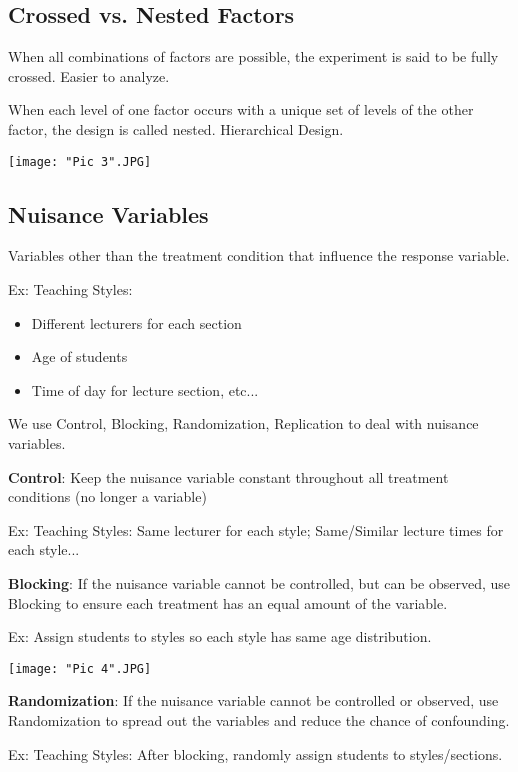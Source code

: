 \documentclass[a4paper,11pt]{article}
\begin{document}
\subsection{Crossed vs. Nested Factors}
When {all combinations} of factors are possible, the experiment is said to be fully {crossed}. Easier to analyze. 

When each level of one factor occurs with a unique set of levels of the other factor, the design is called {nested}. Hierarchical Design. 

\begin{center}
	\texttt{[image: "Pic 3".JPG]}
\end{center}

\subsection{Nuisance Variables}
Variables other than the treatment condition that influence the response variable. 

Ex: Teaching Styles: 
\begin{itemize}
\item Different lecturers for each section
\item Age of students
\item Time of day for lecture section, etc...
\end{itemize}

We use {Control, Blocking, Randomization, Replication} to deal with nuisance variables. 

\textbf{Control}: Keep the nuisance variable constant throughout all treatment conditions (no longer a variable)

Ex: Teaching Styles: Same lecturer for each style; Same/Similar lecture times for each style...

\textbf{Blocking}: If the nuisance variable cannot be controlled, but can be observed, use Blocking to ensure each treatment has an equal amount of the variable. 

Ex: Assign students to styles so each style has same age distribution. 
\begin{center}
	\texttt{[image: "Pic 4".JPG]}
\end{center}

\textbf{Randomization}: If the nuisance variable cannot be controlled or observed, use Randomization to spread out the variables and reduce the chance of confounding. 

Ex: Teaching Styles: After blocking, randomly assign students to styles/sections. 
\end{document}
